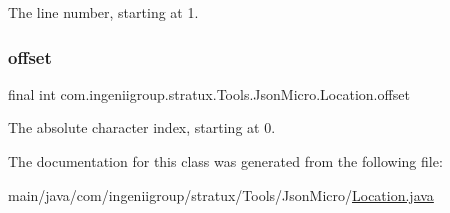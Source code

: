 The line number, starting at 1. \mbox{\label{classcom_1_1ingeniigroup_1_1stratux_1_1_tools_1_1_json_micro_1_1_location_aa67ed089394123d36c7c679fea7c5c65}} 
\subsubsection{\texorpdfstring{offset}{offset}}
{\footnotesize\ttfamily final int com.\+ingeniigroup.\+stratux.\+Tools.\+Json\+Micro.\+Location.\+offset}

The absolute character index, starting at 0. 

The documentation for this class was generated from the following file\+:\begin{DoxyCompactItemize}
\item 
main/java/com/ingeniigroup/stratux/\+Tools/\+Json\+Micro/\hyperlink{_location_8java}{Location.\+java}\end{DoxyCompactItemize}
